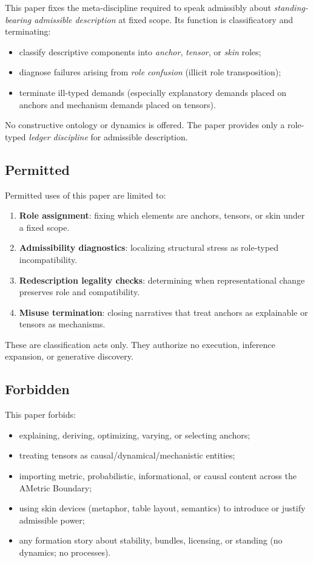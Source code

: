 \documentclass[12pt]{article}
\theoremstyle{plain}
\begin{document}
This paper fixes the meta-discipline required to speak admissibly about \emph{standing-bearing admissible description} at fixed scope. Its function is classificatory and terminating:

\begin{itemize}[leftmargin=*]
\item classify descriptive components into \emph{anchor}, \emph{tensor}, or \emph{skin} roles;
\item diagnose failures arising from \emph{role confusion} (illicit role transposition);
\item terminate ill-typed demands (especially explanatory demands placed on anchors and mechanism demands placed on tensors).
\end{itemize}

No constructive ontology or dynamics is offered. The paper provides only a role-typed \emph{ledger discipline} for admissible description.

\subsection{Permitted}

Permitted uses of this paper are limited to:

\begin{enumerate}[leftmargin=*]
\item \textbf{Role assignment}: fixing which elements are anchors, tensors, or skin under a fixed scope.
\item \textbf{Admissibility diagnostics}: localizing structural stress as role-typed incompatibility.
\item \textbf{Redescription legality checks}: determining when representational change preserves role and compatibility.
\item \textbf{Misuse termination}: closing narratives that treat anchors as explainable or tensors as mechanisms.
\end{enumerate}

These are classification acts only. They authorize no execution, inference expansion, or generative discovery.

\subsection{Forbidden}

This paper forbids:

\begin{itemize}[leftmargin=*]
\item explaining, deriving, optimizing, varying, or selecting anchors;
\item treating tensors as causal/dynamical/mechanistic entities;
\item importing metric, probabilistic, informational, or causal content across the AMetric Boundary;
\item using skin devices (metaphor, table layout, semantics) to introduce or justify admissible power;
\item any formation story about stability, bundles, licensing, or standing (no dynamics; no processes).
\end{itemize}
\end{document}

